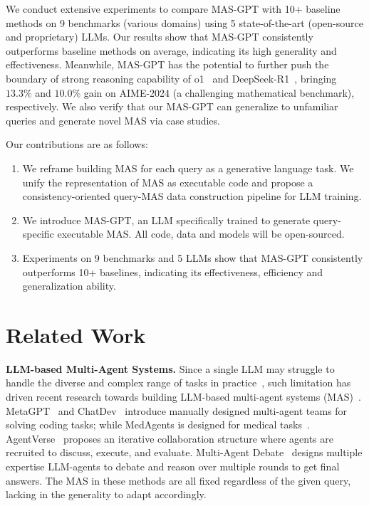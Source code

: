 \documentclass{article}
\theoremstyle{plain}
\theoremstyle{definition}
\theoremstyle{remark}
\begin{document}
We conduct extensive experiments to compare MAS-GPT with 10+ baseline methods on 9 benchmarks (various domains) using 5 state-of-the-art (open-source and proprietary) LLMs.
Our results show that MAS-GPT consistently outperforms baseline methods on average, indicating its high generality and effectiveness.
Meanwhile, MAS-GPT has the potential to further push the boundary of strong reasoning capability of o1~\cite{o1-preview} and DeepSeek-R1~\cite{guo2025deepseek}, bringing $13.3\%$ and $10.0\%$ gain on AIME-2024 (a challenging mathematical benchmark), respectively.
We also verify that our MAS-GPT can generalize to unfamiliar queries and generate novel MAS via case studies.

Our contributions are as follows:
\begin{enumerate}[left=0pt, itemsep=1pt]
    \item We reframe building MAS for each query as a generative language task. We unify the representation of MAS as executable code and propose a consistency-oriented query-MAS data construction pipeline for LLM training.
    \item We introduce MAS-GPT, an LLM specifically trained to generate query-specific executable MAS. All code, data and models will be open-sourced.
    \item Experiments on 9 benchmarks and 5 LLMs show that MAS-GPT consistently outperforms 10+ baselines, indicating its effectiveness, efficiency and generalization ability.
\end{enumerate}

\section{Related Work}
\label{sec:related_work}

\textbf{LLM-based Multi-Agent Systems.}
Since a single LLM may struggle to handle the diverse and complex range of tasks in practice~\cite{li2023camel,qian2024scaling}, such limitation has driven recent research towards building LLM-based multi-agent systems (MAS)~\cite{wang2024unleashing,wu2023autogen}.
MetaGPT~\cite{hongmetagpt} and ChatDev~\cite{qian2024chatdev} introduce manually designed multi-agent teams for solving coding tasks; while MedAgents is designed for medical tasks~\cite{tang-etal-2024-medagents}.
AgentVerse~\cite{chen2023agentverse} proposes an iterative collaboration structure where agents are recruited to discuss, execute, and evaluate.
Multi-Agent Debate~\cite{duimproving,liang-etal-2024-encouraging} designs multiple expertise LLM-agents to debate and reason over multiple rounds to get final answers.
The MAS in these methods are all fixed regardless of the given query, lacking in the generality to adapt accordingly.
\end{document}
